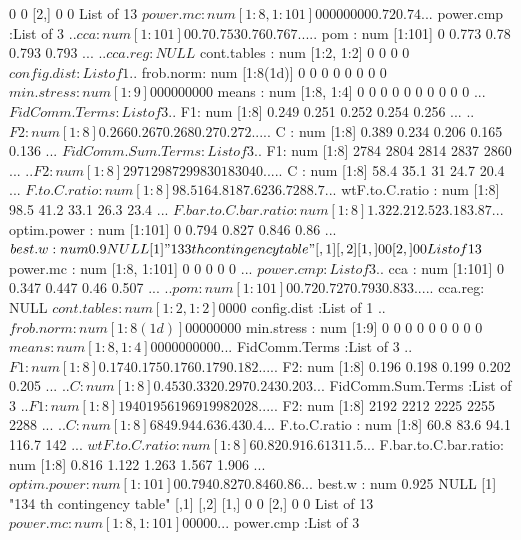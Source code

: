 \documentclass[11pt]{article} %
\begin{document}
\begin{Schunk}
\begin{Soutput}
[1,]    0    0
[2,]    0    0
List of 13
 $ power.mc            : num [1:8, 1:101] 0 0 0 0 0 0 0 0 0.72 0.74 ...
 $ power.cmp           :List of 3
  ..$ cca    : num [1:101] 0 0.7 0.753 0.76 0.767 ...
  ..$ pom    : num [1:101] 0 0.773 0.78 0.793 0.793 ...
  ..$ cca.reg: NULL
 $ cont.tables         : num [1:2, 1:2] 0 0 0 0
 $ config.dist         :List of 1
  ..$ frob.norm: num [1:8(1d)] 0 0 0 0 0 0 0 0
 $ min.stress          : num [1:9] 0 0 0 0 0 0 0 0 0
 $ means               : num [1:8, 1:4] 0 0 0 0 0 0 0 0 0 0 ...
 $ FidComm.Terms       :List of 3
  ..$ F1: num [1:8] 0.249 0.251 0.252 0.254 0.256 ...
  ..$ F2: num [1:8] 0.266 0.267 0.268 0.27 0.272 ...
  ..$ C : num [1:8] 0.389 0.234 0.206 0.165 0.136 ...
 $ FidComm.Sum.Terms   :List of 3
  ..$ F1: num [1:8] 2784 2804 2814 2837 2860 ...
  ..$ F2: num [1:8] 2971 2987 2998 3018 3040 ...
  ..$ C : num [1:8] 58.4 35.1 31 24.7 20.4 ...
 $ F.to.C.ratio        : num [1:8] 98.5 164.8 187.6 236.7 288.7 ...
 $ wtF.to.C.ratio      : num [1:8] 98.5 41.2 33.1 26.3 23.4 ...
 $ F.bar.to.C.bar.ratio: num [1:8] 1.32 2.21 2.52 3.18 3.87 ...
 $ optim.power         : num [1:101] 0 0.794 0.827 0.846 0.86 ...
 $ best.w              : num 0.9
NULL
[1] "133 th contingency table"
     [,1] [,2]
[1,]    0    0
[2,]    0    0
List of 13
 $ power.mc            : num [1:8, 1:101] 0 0 0 0 0 ...
 $ power.cmp           :List of 3
  ..$ cca    : num [1:101] 0 0.347 0.447 0.46 0.507 ...
  ..$ pom    : num [1:101] 0 0.72 0.727 0.793 0.833 ...
  ..$ cca.reg: NULL
 $ cont.tables         : num [1:2, 1:2] 0 0 0 0
 $ config.dist         :List of 1
  ..$ frob.norm: num [1:8(1d)] 0 0 0 0 0 0 0 0
 $ min.stress          : num [1:9] 0 0 0 0 0 0 0 0 0
 $ means               : num [1:8, 1:4] 0 0 0 0 0 0 0 0 0 0 ...
 $ FidComm.Terms       :List of 3
  ..$ F1: num [1:8] 0.174 0.175 0.176 0.179 0.182 ...
  ..$ F2: num [1:8] 0.196 0.198 0.199 0.202 0.205 ...
  ..$ C : num [1:8] 0.453 0.332 0.297 0.243 0.203 ...
 $ FidComm.Sum.Terms   :List of 3
  ..$ F1: num [1:8] 1940 1956 1969 1998 2028 ...
  ..$ F2: num [1:8] 2192 2212 2225 2255 2288 ...
  ..$ C : num [1:8] 68 49.9 44.6 36.4 30.4 ...
 $ F.to.C.ratio        : num [1:8] 60.8 83.6 94.1 116.7 142 ...
 $ wtF.to.C.ratio      : num [1:8] 60.8 20.9 16.6 13 11.5 ...
 $ F.bar.to.C.bar.ratio: num [1:8] 0.816 1.122 1.263 1.567 1.906 ...
 $ optim.power         : num [1:101] 0 0.794 0.827 0.846 0.86 ...
 $ best.w              : num 0.925
NULL
[1] "134 th contingency table"
     [,1] [,2]
[1,]    0    0
[2,]    0    0
List of 13
 $ power.mc            : num [1:8, 1:101] 0 0 0 0 0 ...
 $ power.cmp           :List of 3

\end{Soutput}
\end{Schunk}
\end{document}
